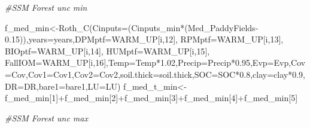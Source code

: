 \documentclass[
  10pt,
  b5paper,
]{book}
\newenvironment{Shaded}{\begin{snugshade}}{\end{snugshade}}
\newcommand{\AttributeTok}[1]{\textcolor[rgb]{0.77,0.63,0.00}{#1}}
\newcommand{\CommentTok}[1]{\textcolor[rgb]{0.56,0.35,0.01}{\textit{#1}}}
\newcommand{\DecValTok}[1]{\textcolor[rgb]{0.00,0.00,0.81}{#1}}
\newcommand{\FloatTok}[1]{\textcolor[rgb]{0.00,0.00,0.81}{#1}}
\newcommand{\FunctionTok}[1]{\textcolor[rgb]{0.00,0.00,0.00}{#1}}
\newcommand{\NormalTok}[1]{#1}
\newcommand{\OtherTok}[1]{\textcolor[rgb]{0.56,0.35,0.01}{#1}}
\newcommand{\SpecialCharTok}[1]{\textcolor[rgb]{0.00,0.00,0.00}{#1}}
\begin{document}
\begin{Shaded}
\begin{Highlighting}[]
\CommentTok{\#SSM Forest unc min}

\NormalTok{f\_med\_min}\OtherTok{\textless{}{-}}\FunctionTok{Roth\_C}\NormalTok{(}\AttributeTok{Cinputs=}\NormalTok{(Cinputs\_min}\SpecialCharTok{*}\NormalTok{(Med\_PaddyFields}\FloatTok{{-}0.15}\NormalTok{)),}\AttributeTok{years=}\NormalTok{years,}\AttributeTok{DPMptf=}\NormalTok{WARM\_UP[i,}\DecValTok{12}\NormalTok{], }\AttributeTok{RPMptf=}\NormalTok{WARM\_UP[i,}\DecValTok{13}\NormalTok{], }\AttributeTok{BIOptf=}\NormalTok{WARM\_UP[i,}\DecValTok{14}\NormalTok{], }\AttributeTok{HUMptf=}\NormalTok{WARM\_UP[i,}\DecValTok{15}\NormalTok{], }\AttributeTok{FallIOM=}\NormalTok{WARM\_UP[i,}\DecValTok{16}\NormalTok{],}\AttributeTok{Temp=}\NormalTok{Temp}\SpecialCharTok{*}\FloatTok{1.02}\NormalTok{,}\AttributeTok{Precip=}\NormalTok{Precip}\SpecialCharTok{*}\FloatTok{0.95}\NormalTok{,}\AttributeTok{Evp=}\NormalTok{Evp,}\AttributeTok{Cov=}\NormalTok{Cov,}\AttributeTok{Cov1=}\NormalTok{Cov1,}\AttributeTok{Cov2=}\NormalTok{Cov2,}\AttributeTok{soil.thick=}\NormalTok{soil.thick,}\AttributeTok{SOC=}\NormalTok{SOC}\SpecialCharTok{*}\FloatTok{0.8}\NormalTok{,}\AttributeTok{clay=}\NormalTok{clay}\SpecialCharTok{*}\FloatTok{0.9}\NormalTok{,}\AttributeTok{DR=}\NormalTok{DR,}\AttributeTok{bare1=}\NormalTok{bare1,}\AttributeTok{LU=}\NormalTok{LU)}
\NormalTok{f\_med\_t\_min}\OtherTok{\textless{}{-}}\NormalTok{f\_med\_min[}\DecValTok{1}\NormalTok{]}\SpecialCharTok{+}\NormalTok{f\_med\_min[}\DecValTok{2}\NormalTok{]}\SpecialCharTok{+}\NormalTok{f\_med\_min[}\DecValTok{3}\NormalTok{]}\SpecialCharTok{+}\NormalTok{f\_med\_min[}\DecValTok{4}\NormalTok{]}\SpecialCharTok{+}\NormalTok{f\_med\_min[}\DecValTok{5}\NormalTok{]}

\CommentTok{\#SSM Forest unc max}


\end{Highlighting}
\end{Shaded}
\end{document}
